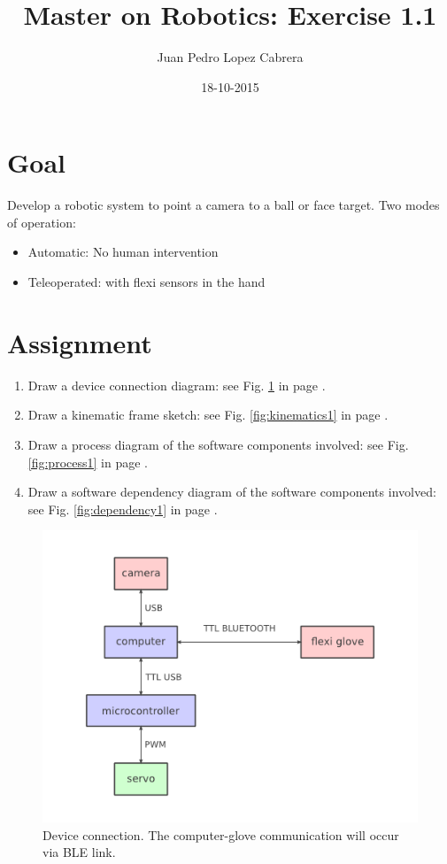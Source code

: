 \documentclass[a4paper]{article}
\title{Master on Robotics: Exercise 1.1}
\date{18-10-2015}
\author{Juan Pedro Lopez Cabrera}
\begin{document}
  \maketitle

  \newpage

  \section{Goal}
  Develop a robotic system to point a camera to a ball or face target.
  Two modes of operation:
  \begin{itemize}
    \item Automatic: No human intervention
    \item Teleoperated: with flexi sensors in the hand
  \end{itemize}

  \section{Assignment}
  \begin{enumerate}
    \item Draw a device connection diagram: see Fig. \ref{fig:connections1} in page \pageref{fig:connections1}.
    \item Draw a kinematic frame sketch: see Fig. \ref{fig:kinematics1} in page \pageref{fig:kinematics1}.
    \item Draw a process diagram of the software components involved: see Fig. \ref{fig:process1} in page \pageref{fig:process1}.
    \item Draw a software dependency diagram of the software components involved: see Fig. \ref{fig:dependency1} in page \pageref{fig:dependency1}.
  \end{enumerate}

  \begin{figure}[ht]
    \centering
    \includegraphics[scale=0.8]{RobocamDeviceConnections}
    \caption{Device connection. The computer-glove communication will occur via BLE link.}
    \label{fig:connections1}
  \end{figure}
\end{document}
